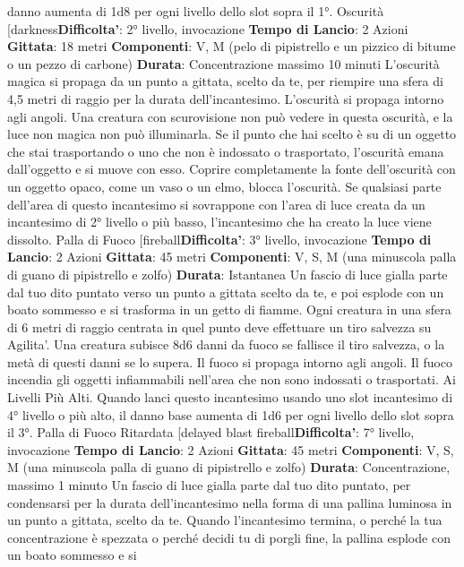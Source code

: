 \begin{multicols}{2}
danno aumenta di 1d8 per ogni livello dello slot sopra il
1°.
Oscurità
[darkness\textbf{Difficolta'}:
2° livello, invocazione
\textbf{Tempo di Lancio}: 2 Azioni
\textbf{Gittata}: 18 metri
\textbf{Componenti}: V, M (pelo di pipistrello e un pizzico di
bitume o un pezzo di carbone)
\textbf{Durata}: Concentrazione massimo 10 minuti
L’oscurità magica si propaga da un punto a gittata,
scelto da te, per riempire una sfera di 4,5 metri di raggio
per la durata dell’incantesimo. L’oscurità si propaga
intorno agli angoli. Una creatura con scurovisione non
può vedere in questa oscurità, e la luce non magica non
può illuminarla.
Se il punto che hai scelto è su di un oggetto che stai
trasportando o uno che non è indossato o trasportato,
l’oscurità emana dall’oggetto e si muove con esso.
Coprire completamente la fonte dell’oscurità con un
oggetto opaco, come un vaso o un elmo, blocca
l’oscurità.
Se qualsiasi parte dell’area di questo incantesimo si
sovrappone con l’area di luce creata da un incantesimo
di 2° livello o più basso, l’incantesimo che ha creato la
luce viene dissolto.
Palla di Fuoco
[fireball\textbf{Difficolta'}:
3° livello, invocazione
\textbf{Tempo di Lancio}: 2 Azioni
\textbf{Gittata}: 45 metri
\textbf{Componenti}: V, S, M (una minuscola palla di guano di
pipistrello e zolfo)
\textbf{Durata}: Istantanea
Un fascio di luce gialla parte dal tuo dito puntato verso
un punto a gittata scelto da te, e poi esplode con un
boato sommesso e si trasforma in un getto di fiamme.
Ogni creatura in una sfera di 6 metri di raggio centrata
in quel punto deve effettuare un tiro salvezza su
Agilita'. Una creatura subisce 8d6 danni da fuoco se
fallisce il tiro salvezza, o la metà di questi danni se lo
supera.
Il fuoco si propaga intorno agli angoli. Il fuoco incendia
gli oggetti infiammabili nell’area che non sono indossati
o trasportati.
Ai Livelli Più Alti. Quando lanci questo incantesimo
usando uno slot incantesimo di 4° livello o più alto, il
danno base aumenta di 1d6 per ogni livello dello slot
sopra il 3°.
Palla di Fuoco Ritardata
[delayed blast fireball\textbf{Difficolta'}:
7° livello, invocazione
\textbf{Tempo di Lancio}: 2 Azioni
\textbf{Gittata}: 45 metri
\textbf{Componenti}: V, S, M (una minuscola palla di guano di
pipistrello e zolfo)
\textbf{Durata}: Concentrazione, massimo 1 minuto
Un fascio di luce gialla parte dal tuo dito puntato, per
condensarsi per la durata dell’incantesimo nella forma
di una pallina luminosa in un punto a gittata, scelto da
te. Quando l’incantesimo termina, o perché la tua
concentrazione è spezzata o perché decidi tu di porgli
fine, la pallina esplode con un boato sommesso e si

\end{multicols}
